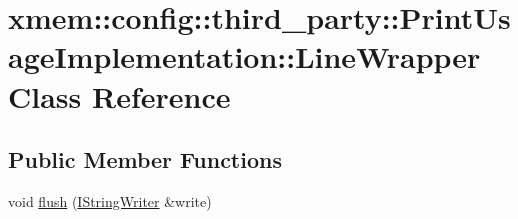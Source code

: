 \hypertarget{classxmem_1_1config_1_1third__party_1_1_print_usage_implementation_1_1_line_wrapper}{}\section{xmem\+:\+:config\+:\+:third\+\_\+party\+:\+:Print\+Usage\+Implementation\+:\+:Line\+Wrapper Class Reference}
\label{classxmem_1_1config_1_1third__party_1_1_print_usage_implementation_1_1_line_wrapper}
\subsection*{Public Member Functions}
\begin{DoxyCompactItemize}
\item 
\hypertarget{classxmem_1_1config_1_1third__party_1_1_print_usage_implementation_1_1_line_wrapper_afb1b356d9ee69285d3c61f887b5e36c2}{}void \hyperlink{classxmem_1_1config_1_1third__party_1_1_print_usage_implementation_1_1_line_wrapper_afb1b356d9ee69285d3c61f887b5e36c2}{flush} (\hyperlink{structxmem_1_1config_1_1third__party_1_1_print_usage_implementation_1_1_i_string_writer}{I\+String\+Writer} \&write)\label{classxmem_1_1config_1_1third__party_1_1_print_usage_implementation_1_1_line_wrapper_afb1b356d9ee69285d3c61f887b5e36c2}


\end{DoxyCompactItemize}

